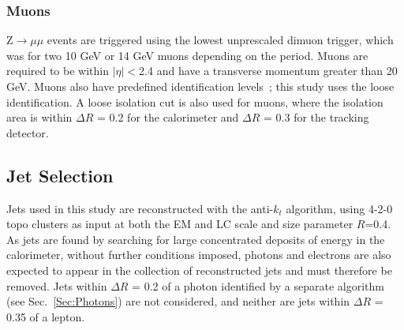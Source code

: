
\subsubsection{Muons}
Z$\rightarrow\mu\mu$ events are triggered using the lowest unprescaled dimuon trigger, which was for two 10 GeV or 14 GeV muons depending on the period.   
Muons are required to be within $\mid\eta\mid<$2.4 and have a transverse momentum greater than 20 GeV.  
Muons also have predefined identification levels~\cite{ATL-PHYS-PUB-2015-037}; this study uses the loose identification.  
A loose isolation cut is also used for muons, where the isolation area is within $\Delta R$ = 0.2 for the calorimeter and $\Delta R$ = 0.3 for the tracking detector.  

\subsection{Jet Selection}
Jets used in this study are reconstructed with the anti-$k_t$ algorithm, using 4-2-0 topo clusters as input at both the EM and LC scale and size parameter $R$=0.4.  
As jets are found by searching for large concentrated deposits of energy in the calorimeter, without further conditions imposed, photons and electrons are also expected to appear in the collection of reconstructed jets and must therefore be removed.  
Jets within $\Delta R$ = 0.2 of a photon identified by a separate algorithm (see Sec.~\ref{Sec:Photons}) are not considered, and neither are jets within $\Delta R$ = 0.35 of a lepton.  

